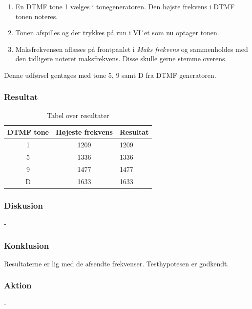 \begin{enumerate}
			\item En DTMF tone 1 vælges i tonegeneratoren. Den højste frekvens i DTMF tonen noteres.
			\item  Tonen afspilles og der trykkes på run i VI´et som nu optager tonen.
			\item Maksfrekvensen aflæses på frontpanlet i \textit{Maks frekvens} og sammenholdes med den tidligere noteret maksfrekvens. Disse skulle gerne stemme overens. 
\end{enumerate}

			Denne udførsel gentages med tone 5, 9 samt D fra DTMF generatoren.

\subsubsection{Resultat}

\begin{table}[h]
				\centering
				\caption{Tabel over resultater}
				\label{FFTresultater}
				\begin{tabular}{lll}
					\multicolumn{1}{l|}{\textbf{DTMF tone}} & 	
					\multicolumn{1}{l|}{\textbf{Højeste frekvens}} & \textbf{Resultat} \\ \hline
					\multicolumn{1}{c|}{1}& 
					\multicolumn{1}{c|}{1209}&1209\\
					\multicolumn{1}{c|}{5}& 
					\multicolumn{1}{c|}{1336}&1336\\
					\multicolumn{1}{c|}{9}& 
					\multicolumn{1}{c|}{1477}&1477\\
					\multicolumn{1}{c|}{D}& 
					\multicolumn{1}{c|}{1633}&1633\\
					
	\end{tabular}
			\end{table}
\subsubsection{Diskusion}

-

\subsubsection{Konklusion}
Resultaterne er lig med de afsendte frekvenser. Testhypotesen er godkendt. 
\subsubsection{Aktion}
-

